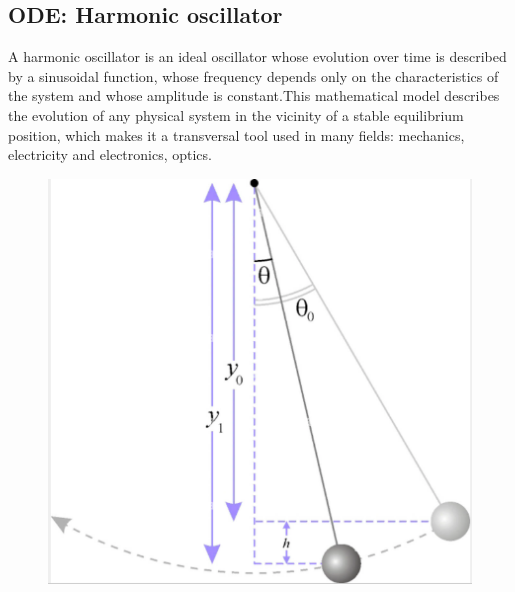 \documentclass[12pt]{article}
\begin{document}
	\subsection{ODE: Harmonic oscillator}
	\noindent A harmonic oscillator is an ideal oscillator whose evolution over time is described by a sinusoidal function, whose frequency depends only on the characteristics of the system and whose amplitude is constant.This mathematical model describes the evolution of any physical system in the vicinity of a stable equilibrium position, which makes it a transversal tool used in many fields: mechanics, electricity and electronics, optics.
	\begin{figure}[H]       
	\begin{minipage}[t]{0.46\linewidth}
		\centering
		\includegraphics[width=\linewidth]{"images/Diff_equation/Harmonic_oss_1.png"}
	\end{minipage} \hfill
	\begin{minipage}[t]{0.48\linewidth}
		\centering

\end{minipage}
\end{figure}
\end{document}
